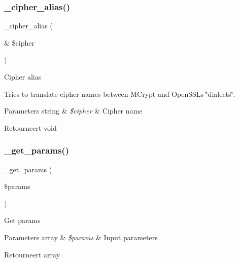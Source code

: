 \subsubsection{\texorpdfstring{\_cipher\_alias()}{\_cipher\_alias()}}
{\footnotesize\ttfamily \+\_\+cipher\+\_\+alias (\begin{DoxyParamCaption}\item[{\&}]{\$cipher }\end{DoxyParamCaption})\hspace{0.3cm}{\ttfamily [protected]}}

Cipher alias

Tries to translate cipher names between M\+Crypt and Open\+S\+SL\textquotesingle{}s \char`\"{}dialects\char`\"{}.


\begin{DoxyParams}[1]{Parameters}
string & {\em \$cipher} & Cipher name \\
\hline
\end{DoxyParams}
\begin{DoxyReturn}{Retourneert}
void 
\end{DoxyReturn}
\mbox{\label{class_c_i___encryption_ab5bb04b4151b23afd9dccad358b3967b}} 
\subsubsection{\texorpdfstring{\_get\_params()}{\_get\_params()}}
{\footnotesize\ttfamily \+\_\+get\+\_\+params (\begin{DoxyParamCaption}\item[{}]{\$params }\end{DoxyParamCaption})\hspace{0.3cm}{\ttfamily [protected]}}

Get params


\begin{DoxyParams}[1]{Parameters}
array & {\em \$params} & Input parameters \\
\hline
\end{DoxyParams}
\begin{DoxyReturn}{Retourneert}
array 
\end{DoxyReturn}
\mbox{\label{class_c_i___encryption_a7d3a3c3cc3609b5af60bfa953892a058}} 
